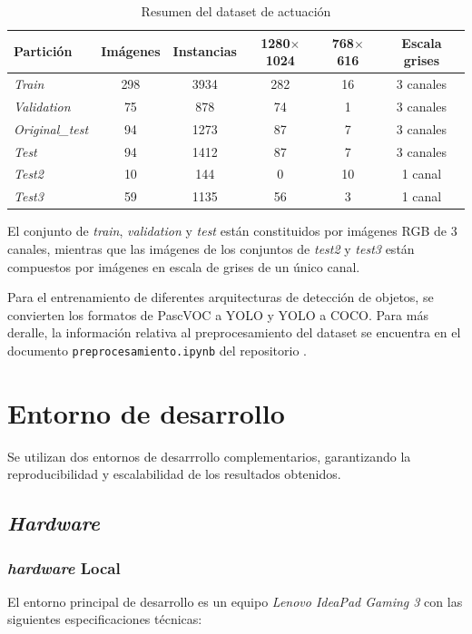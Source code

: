 \documentclass[12pt,a4paper,onecolumn,oneside]{report}
\begin{document}
\clearpage
\begin{table}[htbp]
\caption{Resumen del dataset de actuación}
\centering
{}
\begin{tabular}{l c c c c c}
\toprule
Partición & Imágenes & Instancias & 1280$\times$1024 & 768$\times$616 & Escala grises\\
\midrule
\textit{Train}          & 298 & 3934 & 282 & 16 & 3 canales\\
\textit{Validation}     &  75 &  878 & 74  & 1  & 3 canales\\
\textit{Original\_test} &  94 & 1273 & 87  & 7  & 3 canales\\
\textit{Test}           &  94 & 1412 & 87  & 7  & 3 canales\\
\textit{Test2}          &  10 &  144 & 0   & 10 & 1 canal\\
\textit{Test3}          &  59 & 1135 & 56  & 3  & 1 canal\\
\bottomrule
\end{tabular}
\label{tab:dataset_final}
\end{table}

El conjunto de \textit{train}, \textit{validation} y \textit{test} están constituidos por imágenes RGB de 3 canales, mientras que las imágenes 
de los conjuntos de \textit{test2} y \textit{test3} están compuestos por imágenes en escala de grises de un único canal. 

Para el entrenamiento de diferentes arquitecturas de detección de objetos, se convierten los formatos de PascVOC a YOLO y YOLO a COCO. 
Para más deralle, la información relativa al preprocesamiento del dataset se encuentra en el documento \texttt{preprocesamiento.ipynb} del repositorio \cite{repoTFM}.

\section{Entorno de desarrollo}
\label{sec:Entorno de desarrollo}
Se utilizan dos entornos de desarrrollo complementarios, garantizando la reproducibilidad y escalabilidad de los resultados obtenidos.

\subsection{\textit{Hardware}}
\subsubsection{\textit{hardware} Local}
\label{sec:hardware_local}
El entorno principal de desarrollo es un equipo \textit{Lenovo IdeaPad Gaming 3} con las siguientes especificaciones técnicas:
\end{document}
